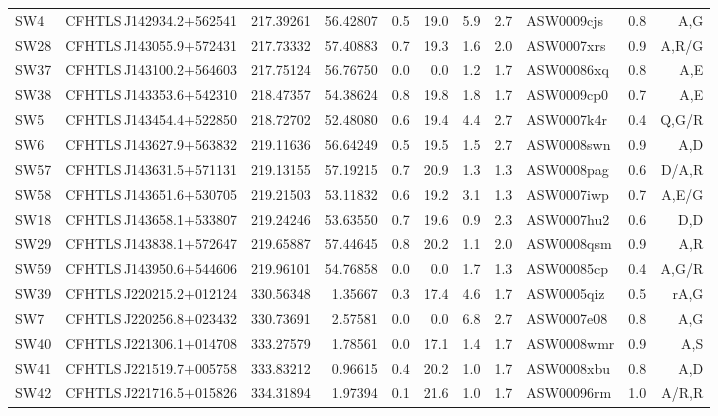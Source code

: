 \documentclass[useAMS,usenatbib,a4paper]{mn2e}
\begin{document}
\begin{center}
\begin{longtable}{llrrrrrrlrr}
SW4  & CFHTLS\,J142934.2$+$562541 & 217.39261 &    56.42807 &  0.5 & 19.0 &  5.9 &  2.7 & ASW0009cjs &  0.8 &  A,G   \\ 
SW28 & CFHTLS\,J143055.9$+$572431 & 217.73332 &    57.40883 &  0.7 & 19.3 &  1.6 &  2.0 & ASW0007xrs &  0.9 &  A,R/G   \\ 
SW37 & CFHTLS\,J143100.2$+$564603 & 217.75124 &    56.76750 &  0.0 &  0.0 &  1.2 &  1.7 & ASW00086xq &  0.8 &  A,E   \\ 
SW38 & CFHTLS\,J143353.6$+$542310 & 218.47357 &    54.38624 &  0.8 & 19.8 &  1.8 &  1.7 & ASW0009cp0 &  0.7 &  A,E   \\ 
SW5  & CFHTLS\,J143454.4$+$522850 & 218.72702 &    52.48080 &  0.6 & 19.4 &  4.4 &  2.7 & ASW0007k4r &  0.4 &  Q,G/R   \\ 
SW6  & CFHTLS\,J143627.9$+$563832 & 219.11636 &    56.64249 &  0.5 & 19.5 &  1.5 &  2.7 & ASW0008swn &  0.9 &  A,D   \\ 
SW57 & CFHTLS\,J143631.5$+$571131 & 219.13155 &    57.19215 &  0.7 & 20.9 &  1.3 &  1.3 & ASW0008pag &  0.6 &  D/A,R   \\ 
SW58 & CFHTLS\,J143651.6$+$530705 & 219.21503 &    53.11832 &  0.6 & 19.2 &  3.1 &  1.3 & ASW0007iwp &  0.7 &  A,E/G   \\ 
SW18 & CFHTLS\,J143658.1$+$533807 & 219.24246 &    53.63550 &  0.7 & 19.6 &  0.9 &  2.3 & ASW0007hu2 &  0.6 &  D,D   \\ 
SW29 & CFHTLS\,J143838.1$+$572647 & 219.65887 &    57.44645 &  0.8 & 20.2 &  1.1 &  2.0 & ASW0008qsm &  0.9 &  A,R   \\ 
SW59 & CFHTLS\,J143950.6$+$544606 & 219.96101 &    54.76858 &  0.0 &  0.0 &  1.7 &  1.3 & ASW00085cp &  0.4 &  A,G/R   \\ 
SW39 & CFHTLS\,J220215.2$+$012124 & 330.56348 &     1.35667 &  0.3 & 17.4 &  4.6 &  1.7 & ASW0005qiz &  0.5 &  rA,G   \\ 
SW7  & CFHTLS\,J220256.8$+$023432 & 330.73691 &     2.57581 &  0.0 &  0.0 &  6.8 &  2.7 & ASW0007e08 &  0.8 &  A,G   \\ 
SW40 & CFHTLS\,J221306.1$+$014708 & 333.27579 &     1.78561 &  0.0 & 17.1 &  1.4 &  1.7 & ASW0008wmr &  0.9 &  A,S   \\ 
SW41 & CFHTLS\,J221519.7$+$005758 & 333.83212 &     0.96615 &  0.4 & 20.2 &  1.0 &  1.7 & ASW0008xbu &  0.8 &  A,D   \\ 
SW42 & CFHTLS\,J221716.5$+$015826 & 334.31894 &     1.97394 &  0.1 & 21.6 &  1.0 &  1.7 & ASW00096rm &  1.0 &  A/R,R   \\ 
\end{longtable}
\end{center}
\end{document}
